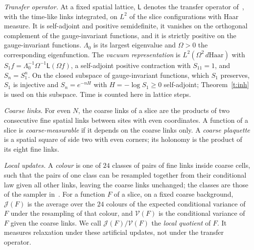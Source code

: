 \emph{Transfer operator.} At a fixed spatial lattice, $\mathsf L$ denotes the transfer operator
of~\cite{Lu77,OS78}, with the time-like links integrated, on $L^2$ of the slice configurations with Haar
measure. It is self-adjoint and positive semidefinite, it vanishes on the orthogonal complement of the
gauge-invariant functions, and it is strictly positive on the gauge-invariant functions. $\Lambda_0$ is its
largest eigenvalue and $\Omega>0$ the corresponding eigenfunction. The \emph{vacuum representation} is
$L^2(\Omega^2\,d\mathrm{Haar})$ with $S_1f=\Lambda_0^{-1}\Omega^{-1}\mathsf L(\Omega f)$, a self-adjoint positive
contraction with $S_11=1$, and $S_n=S_1^n$. On the closed subspace of gauge-invariant functions, which $S_1$
preserves, $S_1$ is injective and $S_n=e^{-nH}$ with $H=-\log S_1\ge0$ self-adjoint; Theorem~\ref{t:inh} is
used on this subspace. Time is counted here in lattice steps.

\emph{Coarse links.} For even $N$, the coarse links of a slice are the products of two consecutive fine
spatial links between sites with even coordinates. A function of a slice is \emph{coarse-measurable} if it
depends on the coarse links only. A \emph{coarse plaquette} is a spatial square of side two with even corners;
its holonomy is the product of its eight fine links.

\emph{Local updates.} A \emph{colour} is one of $24$ classes of pairs of fine links inside coarse cells, such
that the pairs of one class can be resampled together from their conditional law given all other links,
leaving the coarse links unchanged; the classes are those of the sampler in~\cite{RepoData}. For a function
$F$ of a slice, on a fixed coarse background, $\mathcal J(F)$ is the average over the $24$ colours of the
expected conditional variance of $F$ under the resampling of that colour, and $\mathcal V(F)$ is the
conditional variance of $F$ given the coarse links. We call $\mathcal J(F)/\mathcal V(F)$ the \emph{local
quotient} of $F$. It measures relaxation under these artificial updates, not under the transfer operator.

